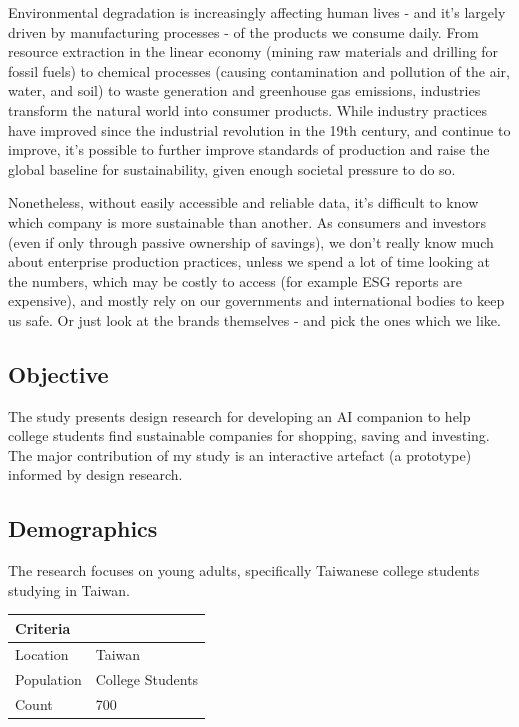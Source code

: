 \documentclass[
  letterpaper,
  DIV=11,
  numbers=noendperiod]{scrartcl}
\begin{document}
Environmental degradation is increasingly affecting human lives - and
it's largely driven by manufacturing processes - of the products we
consume daily. From resource extraction in the linear economy (mining
raw materials and drilling for fossil fuels) to chemical processes
(causing contamination and pollution of the air, water, and soil) to
waste generation and greenhouse gas emissions, industries transform the
natural world into consumer products. While industry practices have
improved since the industrial revolution in the 19th century, and
continue to improve, it's possible to further improve standards of
production and raise the global baseline for sustainability, given
enough societal pressure to do so.

Nonetheless, without easily accessible and reliable data, it's difficult
to know which company is more sustainable than another. As consumers and
investors (even if only through passive ownership of savings), we don't
really know much about enterprise production practices, unless we spend
a lot of time looking at the numbers, which may be costly to access (for
example ESG reports are expensive), and mostly rely on our governments
and international bodies to keep us safe. Or just look at the brands
themselves - and pick the ones which we like.

\subsection{Objective}\label{objective}

The study presents design research for developing an AI companion to
help college students find sustainable companies for shopping, saving
and investing. The major contribution of my study is an interactive
artefact (a prototype) informed by design research.

\subsection{Demographics}\label{demographics}

The research focuses on young adults, specifically Taiwanese college
students studying in Taiwan.

\begin{longtable}[]{@{}ll@{}}
\toprule\noalign{}
Criteria & \\
\midrule\noalign{}
\endhead
\bottomrule\noalign{}
\endlastfoot
Location & Taiwan \\
Population & College Students \\
Count & 700 \\
\end{longtable}
\end{document}
